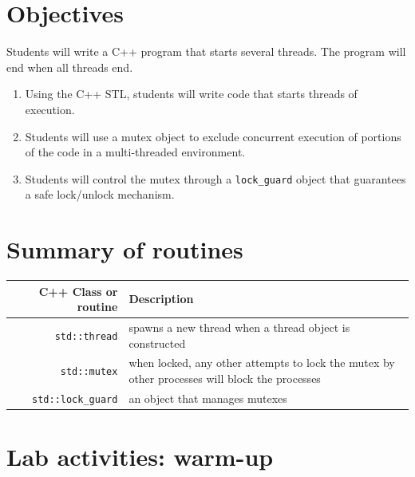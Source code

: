 \documentclass[12pt]{book}
\begin{document}
\section{Objectives}

Students will write a C++ program that starts several threads. The program will end when all threads end.

\begin{enumerate}[label=Objective \arabic*]
\item\label{thread.start} Using the C++ STL, students will write code that starts threads of execution.
\item\label{mutex} Students will use a mutex object to exclude concurrent execution of portions of the code in a multi-threaded environment.
\item\label{lock.guard} Students will control the mutex through a \lstinline$lock_guard$ object that guarantees a safe lock/unlock mechanism.
\end{enumerate}


\section{Summary of routines}

\begin{tabularx}{\textwidth}{r  X}
  C++ Class or routine & Description \\ \midrule
  \lstinline$std::thread$ & spawns a new thread when a thread object is constructed  \\
  \lstinline$std::mutex$ & when locked, any other attempts to lock the mutex by other processes will block the processes \\
  \lstinline$std::lock_guard$ & an object that manages mutexes
\end{tabularx}

\section{Lab activities: warm-up}
\end{document}
